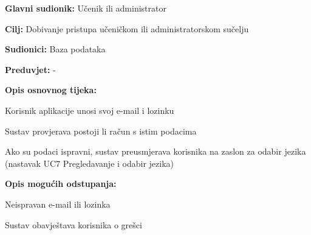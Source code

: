 \noindent {}
\begin{packed_item}

	\item \textbf{Glavni sudionik: } Učenik ili administrator
	\item \textbf{Cilj: } Dobivanje pristupa učeničkom ili administratorskom sučelju
	\item \textbf{Sudionici: } Baza podataka
	\item \textbf{Preduvjet: } -
	\item  \textbf{Opis osnovnog tijeka:}
	
	\item[] \begin{packed_enum}

		\item Korisnik aplikacije unosi svoj e-mail i lozinku
		\item Sustav provjerava postoji li račun s istim podacima
		\item Ako su podaci ispravni, sustav preusmjerava korisnika na zaslon za odabir jezika (nastavak UC7 Pregledavanje i odabir jezika)

	\end{packed_enum}
	
	\item  \textbf{Opis mogućih odstupanja:}
	
	\item[] \begin{packed_item}

		\item[2.a] Neispravan e-mail ili lozinka
		\item[] \begin{packed_enum}
			
			\item Sustav obavještava korisnika o grešci
			
		\end{packed_enum}
		
	\end{packed_item}
\end{packed_item}


